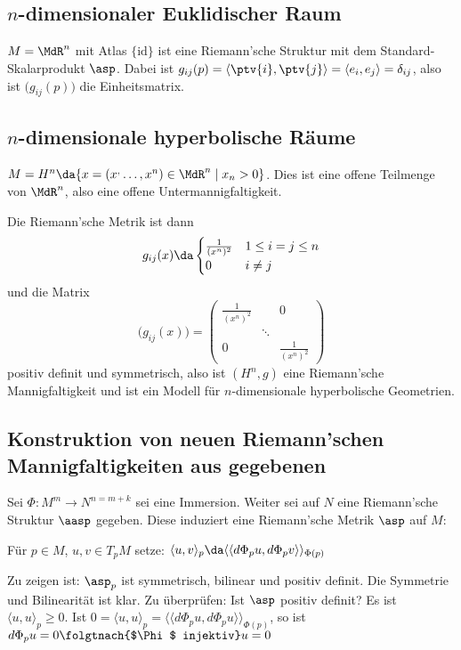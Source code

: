 \documentclass[a4paper,twoside,DIV15,BCOR12mm]{scrbook}
\begin{document}
\subsection{$n$-dimensionaler Euklidischer Raum}
$M=\MdR^n$ mit Atlas $\{\text{id}\}$ ist eine Riemann’sche Struktur mit dem Standard-Skalarprodukt $\asp$. Dabei ist $g_{ij}(p) = \langle \ptv{i}, \ptv{j} \rangle = \langle e_i, e_j \rangle = \delta_{ij}$, also ist $\big(g_{ij}(p)\big)$ die Einheitsmatrix.

\subsection{$n$-dimensionale hyperbolische Räume}
$M = H^n \da \{ x = (x^,\ldots, x^n) \in \MdR^n \mid x_n > 0 \}$. Dies ist eine offene Teilmenge von $\MdR^n$, also eine offene Untermannigfaltigkeit.

Die Riemann’sche Metrik ist dann 
\[
g_{ij}(x) \da 
\begin{cases}
\frac 1 {(x^n)^2} & 1\le i = j \le n \\
0 & i \ne j
\end{cases}
\]
und die Matrix 
\[
\big(g_{ij}(x)\big) = 
\begin{pmatrix}
\frac 1 {(x^n)^2}& & 0 \\
& \ddots & \\
0 & & \frac 1 {(x^n)^2}
\end{pmatrix}
\]
positiv definit und symmetrisch, also ist $(H^n, g)$ eine Riemann’sche Mannigfaltigkeit und ist ein Modell für $n$-dimensionale hyperbolische Geometrien.

\subsection{Konstruktion von neuen Riemann’schen Mannigfaltigkeiten aus gegebenen}

Sei $\Phi: M^m \to N^{n=m+k}$ sei eine Immersion. Weiter sei auf $N$ eine Riemann’sche Struktur $\aasp$ gegeben. Diese induziert eine Riemann’sche Metrik $\asp$ auf $M$:

Für $p\in M$, $u,v\in T_pM$ setze: $\langle u,v\rangle_p \da \langle\langle d\Phi_pu, d\Phi_p v \rangle\rangle_{\Phi(p)}$

Zu zeigen ist: $\asp_p$ ist symmetrisch, bilinear und positiv definit. Die Symmetrie und Bilinearität ist klar. Zu überprüfen: Ist $\asp$ positiv definit? Es ist $\langle u,u\rangle_p \ge 0$. Ist $0 = \langle u,u\rangle_p = \langle\langle d\Phi_pu,d\Phi_pu\rangle\rangle_{\Phi(p)}$, so ist $d\Phi_pu = 0 \folgtnach{$\Phi$ injektiv} u = 0$
\end{document}
